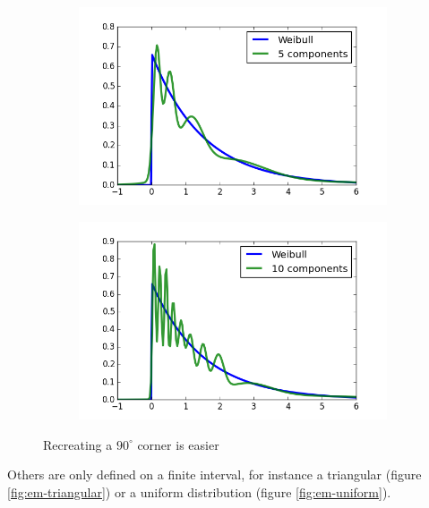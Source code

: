 \documentclass[11pt,a4paper]{book}
\begin{document}
\begin{figure}[h]
  \centering
  \begin{subfigure}{0.45\textwidth}
    \centering
    \includegraphics[width=\textwidth]{thesis/em/weibull-5-components}
  \end{subfigure}
  \hfill
  \begin{subfigure}{0.45\textwidth}
    \centering
    \includegraphics[width=\textwidth]{thesis/em/weibull-10-components}
  \end{subfigure}
  \caption{Recreating a $90^{\circ}$ corner is easier}
  \label{fig:em-weibull}
\end{figure}

Others are only defined on a finite interval, for instance a triangular (figure
\ref{fig:em-triangular}) or a uniform distribution (figure
\ref{fig:em-uniform}).
\end{document}
